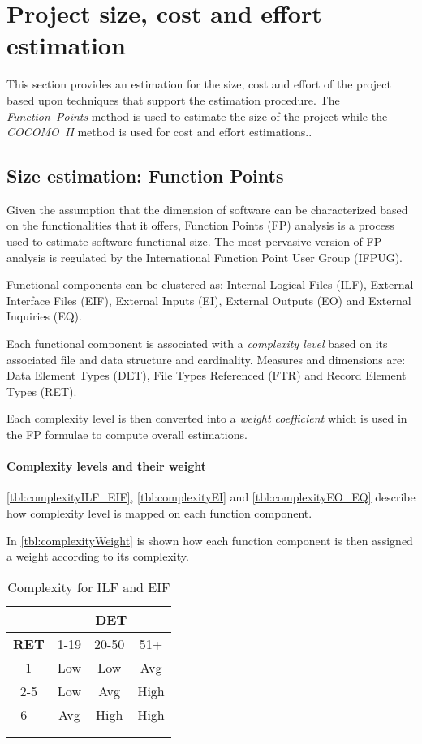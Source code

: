 \section[Project estimations]{Project size, cost and effort estimation}

This section provides an estimation for the size, cost and effort of the project based upon techniques that support the estimation procedure. The \mbox{\emph{Function Points}} method is used to estimate the size of the project while the  \mbox{\emph{COCOMO II}} method is used for cost and effort estimations..

\subsection{Size estimation: Function Points}
Given the assumption that the dimension of software can be characterized based on the functionalities that it offers, Function Points (FP) analysis is a process used to estimate software functional size. The most pervasive version of FP analysis is regulated by the International Function Point User Group (IFPUG).

Functional components can be clustered as: Internal Logical Files (ILF), External Interface Files (EIF), External Inputs (EI), External Outputs (EO) and External Inquiries (EQ).

Each functional component is associated with a \emph{complexity level} based on its associated file and data structure and cardinality. Measures and dimensions are: Data Element Types (DET), File Types Referenced (FTR) and Record Element Types (RET).

Each complexity level is then converted into a \emph{weight coefficient} which is used in the FP formulae to compute overall estimations.

\paragraph{Complexity levels and their weight}\autoref{tbl:complexityILF_EIF}, \autoref{tbl:complexityEI} and \autoref{tbl:complexityEO_EQ} describe how complexity level is mapped on each function component. 

In \autoref{tbl:complexityWeight} is shown how each function component is then assigned a weight
according to its complexity. \\


\begin{longtable}{cccc}
\toprule
\multicolumn{1}{c}{} & 
\multicolumn{3}{c}{\textbf{DET}}\\
\midrule
\textbf{RET} & 1-19 & 20-50 & 51+ \\
\midrule
1	&	Low	&	Low		&	Avg \\
2-5	&	Low	&	Avg		&	High \\
6+	&	Avg	&	High	&	High\\
\bottomrule \\
\caption{Complexity for ILF and EIF}
\label{tbl:complexityILF_EIF}
\end{longtable}


